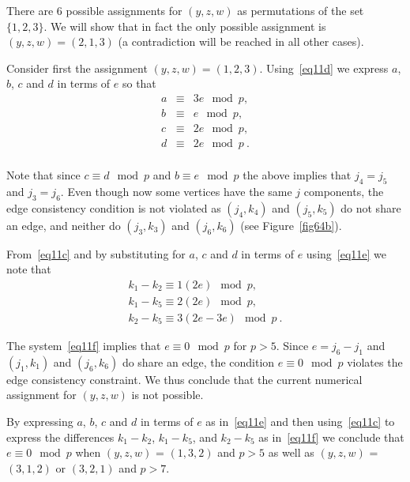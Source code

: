 There are 6 possible assignments for $(y,z,w)$ as permutations of
the set $\{1,2,3\}$. We will show that in fact the only possible
assignment is $(y,z,w)=(2,1,3)$ (a contradiction will be reached
in all other cases).

Consider first the assignment $(y,z,w)=(1,2,3)$.
Using~\eqref{eq11d} we express $a$, $b$, $c$ and $d$ in terms of
$e$ so that
\begin{equation}\label{eq11e}\begin{array}{cccc}
a &\equiv & 3e \mod p, \\
b &\equiv & e \mod p, \\
c &\equiv & 2e \mod p, \\
d &\equiv & 2e \mod p~. \\
\end{array}\end{equation}

Note that since $c \equiv d \mod p$ and  $b \equiv e \mod p$ the
above implies that $j_4=j_5$ and $j_3=j_6$. Even though now some
vertices have the same $j$ components, the edge consistency
condition is not violated as $(j_4,k_4)$ and $(j_5,k_5)$ do not
share an edge, and neither do $(j_3,k_3)$ and $(j_6,k_6)$ (see
Figure~\ref{fig64b}).

From~\eqref{eq11c} and by substituting for $a$, $c$ and $d$ in
terms of $e$ using~\eqref{eq11e} we note that
\begin{equation}\label{eq11f}\begin{array}{cccc}
k_1-k_2 \equiv 1(2e) \mod p, \\
k_1-k_5 \equiv 2(2e) \mod p, \\
k_2-k_5 \equiv 3(2e-3e) \mod p~.
\end{array}\end{equation}

The system~\eqref{eq11f} implies that $e \equiv 0 \mod p$ for
$p>5$. Since $e=j_6-j_1$ and $(j_1,k_1)$ and $(j_6,k_6)$ do share
an edge, the condition $e \equiv 0 \mod p$ violates the edge
consistency constraint. We thus conclude that the current
numerical assignment for $(y,z,w)$ is not possible.

By expressing $a$, $b$, $c$ and $d$ in terms of $e$ as
in~\eqref{eq11e} and then using~\eqref{eq11c} to express the
differences $k_1-k_2$, $k_1-k_5$, and $k_2-k_5$ as
in~\eqref{eq11f} we conclude that $e \equiv 0 \mod p$ when
$(y,z,w)$ = $(1,3,2)$ and $p>5$ as well as $(y,z,w)$ = $(3,1,2)$
or $(3,2,1)$ and $p>7$.

